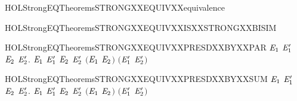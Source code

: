 \newcommand{\HOLStrongEQTheoremsSTRONGXXEQUIVXXcoind}{\UseVerbatim{HOLStrongEQTheoremsSTRONGXXEQUIVXXcoind}}
\begin{SaveVerbatim}{HOLStrongEQTheoremsSTRONGXXEQUIVXXequivalence}
\HOLTokenTurnstile{}  
\end{SaveVerbatim}
\newcommand{\HOLStrongEQTheoremsSTRONGXXEQUIVXXequivalence}{\UseVerbatim{HOLStrongEQTheoremsSTRONGXXEQUIVXXequivalence}}
\begin{SaveVerbatim}{HOLStrongEQTheoremsSTRONGXXEQUIVXXISXXSTRONGXXBISIM}
\HOLTokenTurnstile{}  
\end{SaveVerbatim}
\newcommand{\HOLStrongEQTheoremsSTRONGXXEQUIVXXISXXSTRONGXXBISIM}{\UseVerbatim{HOLStrongEQTheoremsSTRONGXXEQUIVXXISXXSTRONGXXBISIM}}
\begin{SaveVerbatim}{HOLStrongEQTheoremsSTRONGXXEQUIVXXPRESDXXBYXXPAR}
\HOLTokenTurnstile{} \HOLSymConst{\HOLTokenForall{}}\ensuremath{\HOLBoundVar{E}\sb{\mathrm{1}}} \ensuremath{\HOLBoundVar{E}\sb{\mathrm{1}}\sp{\prime}} \ensuremath{\HOLBoundVar{E}\sb{\mathrm{2}}} \ensuremath{\HOLBoundVar{E}\sb{\mathrm{2}}\sp{\prime}}.
        \ensuremath{\HOLBoundVar{E}\sb{\mathrm{1}}} \ensuremath{\HOLBoundVar{E}\sb{\mathrm{1}}\sp{\prime}} \HOLSymConst{\HOLTokenConj{}}  \ensuremath{\HOLBoundVar{E}\sb{\mathrm{2}}} \ensuremath{\HOLBoundVar{E}\sb{\mathrm{2}}\sp{\prime}} \HOLSymConst{\HOLTokenImp{}}
        \ensuremath{(}\ensuremath{\HOLBoundVar{E}\sb{\mathrm{1}}} \HOLSymConst{\ensuremath{\mid}} \ensuremath{\HOLBoundVar{E}\sb{\mathrm{2}}}\ensuremath{)} \ensuremath{(}\ensuremath{\HOLBoundVar{E}\sb{\mathrm{1}}\sp{\prime}} \HOLSymConst{\ensuremath{\mid}} \ensuremath{\HOLBoundVar{E}\sb{\mathrm{2}}\sp{\prime}}\ensuremath{)}
\end{SaveVerbatim}
\newcommand{\HOLStrongEQTheoremsSTRONGXXEQUIVXXPRESDXXBYXXPAR}{\UseVerbatim{HOLStrongEQTheoremsSTRONGXXEQUIVXXPRESDXXBYXXPAR}}
\begin{SaveVerbatim}{HOLStrongEQTheoremsSTRONGXXEQUIVXXPRESDXXBYXXSUM}
\HOLTokenTurnstile{} \HOLSymConst{\HOLTokenForall{}}\ensuremath{\HOLBoundVar{E}\sb{\mathrm{1}}} \ensuremath{\HOLBoundVar{E}\sb{\mathrm{1}}\sp{\prime}} \ensuremath{\HOLBoundVar{E}\sb{\mathrm{2}}} \ensuremath{\HOLBoundVar{E}\sb{\mathrm{2}}\sp{\prime}}.
        \ensuremath{\HOLBoundVar{E}\sb{\mathrm{1}}} \ensuremath{\HOLBoundVar{E}\sb{\mathrm{1}}\sp{\prime}} \HOLSymConst{\HOLTokenConj{}}  \ensuremath{\HOLBoundVar{E}\sb{\mathrm{2}}} \ensuremath{\HOLBoundVar{E}\sb{\mathrm{2}}\sp{\prime}} \HOLSymConst{\HOLTokenImp{}}
        \ensuremath{(}\ensuremath{\HOLBoundVar{E}\sb{\mathrm{1}}} \HOLSymConst{\ensuremath{+}} \ensuremath{\HOLBoundVar{E}\sb{\mathrm{2}}}\ensuremath{)} \ensuremath{(}\ensuremath{\HOLBoundVar{E}\sb{\mathrm{1}}\sp{\prime}} \HOLSymConst{\ensuremath{+}} \ensuremath{\HOLBoundVar{E}\sb{\mathrm{2}}\sp{\prime}}\ensuremath{)}
\end{SaveVerbatim}
